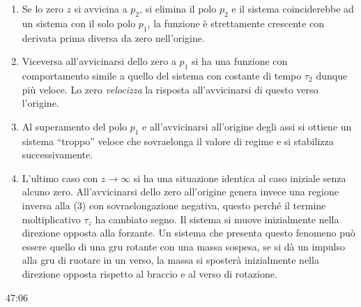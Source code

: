  \begin{figure}[h]
 \centering
\end{figure}

\begin{enumerate}
\item Se lo zero $z$ si avvicina a $p_2$, si elimina il polo $p_2$ e il sistema
coinciderebbe ad un sistema con il solo polo $p_1$, la funzione è strettamente
crescente con derivata prima diversa da zero nell'origine.

\item Viceversa all'avvicinarsi dello zero a $p_1$ si ha una funzione con
comportamento simile a quello del sistema con costante di tempo $\tau_2$ dunque
più veloce.
Lo zero \textit{velocizza} la risposta all'avvicinarsi di questo verso
l'origine.

\item Al superamento del polo $p_1$ e all'avvicinarsi all'origine degli assi si
ottiene un sistema ``troppo'' veloce che sovraelonga il valore di regime e si
stabilizza successivamente.

\item L'ultimo caso con $z\to \infty$ si ha una situazione identica al caso
iniziale senza alcuno zero.
All'avvicinarsi dello zero all'origine genera invece una regione inversa alla
(3) con sovraelongazione negativa, questo perché il termine
moltiplicativo $\tau_z$ ha cambiato segno. Il sistema si muove inizialmente
nella direzione opposta alla forzante.
Un sistema che presenta questo fenomeno può essere quello di una gru rotante
con una massa sospesa, se si dà un impulso alla gru di ruotare in un
verso, la massa si sposterà inizialmente nella direzione opposta rispetto al
braccio e al verso di rotazione.
\end{enumerate}

47:06

